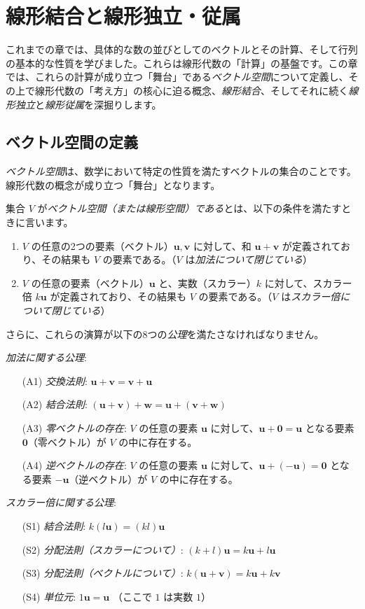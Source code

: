 \section{線形結合と線形独立・従属}
これまでの章では、具体的な数の並びとしてのベクトルとその計算、そして行列の基本的な性質を学びました。これらは線形代数の「計算」の基盤です。この章では、これらの計算が成り立つ「舞台」である\emph{ベクトル空間}について定義し、その上で線形代数の「考え方」の核心に迫る概念、\emph{線形結合}、そしてそれに続く\emph{線形独立}と\emph{線形従属}を深掘りします。
\subsection{ベクトル空間の定義}
\emph{ベクトル空間}は、数学において特定の性質を満たすベクトルの集合のことです。線形代数の概念が成り立つ「舞台」となります。
\begin{dfn}[ベクトル空間]
集合 $V$ が\emph{ベクトル空間（または線形空間）である}とは、以下の条件を満たすときに言います。

\begin{enumerate}
\item $V$ の任意の2つの要素（ベクトル）$\bm{u}, \bm{v}$ に対して、和 $\bm{u} + \bm{v}$ が定義されており、その結果も $V$ の要素である。（$V$ は\emph{加法について閉じている}）
\item $V$ の任意の要素（ベクトル）$\bm{u}$ と、実数（スカラー）$k$ に対して、スカラー倍 $k\bm{u}$ が定義されており、その結果も $V$ の要素である。（$V$ は\emph{スカラー倍について閉じている}）
\end{enumerate}

さらに、これらの演算が以下の8つの\emph{公理}を満たさなければなりません。

\emph{加法に関する公理}:
\begin{itemize}
\item[(A1)] \emph{交換法則}: $\bm{u} + \bm{v} = \bm{v} + \bm{u}$
\item[(A2)] \emph{結合法則}: $(\bm{u} + \bm{v}) + \bm{w} = \bm{u} + (\bm{v} + \bm{w})$
\item[(A3)] \emph{零ベクトルの存在}: $V$ の任意の要素 $\bm{u}$ に対して、$\bm{u} + \bm{0} = \bm{u}$ となる要素 $\bm{0}$（零ベクトル）が $V$ の中に存在する。
\item[(A4)] \emph{逆ベクトルの存在}: $V$ の任意の要素 $\bm{u}$ に対して、$\bm{u} + (-\bm{u}) = \bm{0}$ となる要素 $-\bm{u}$（逆ベクトル）が $V$ の中に存在する。
\end{itemize}

\emph{スカラー倍に関する公理}:
\begin{itemize}
\item[(S1)] \emph{結合法則}: $k(l\bm{u}) = (kl)\bm{u}$
\item[(S2)] \emph{分配法則（スカラーについて）}: $(k+l)\bm{u} = k\bm{u} + l\bm{u}$
\item[(S3)] \emph{分配法則（ベクトルについて）}: $k(\bm{u}+\bm{v}) = k\bm{u} + k\bm{v}$
\item[(S4)] \emph{単位元}: $1\bm{u} = \bm{u}$ （ここで $1$ は実数 $1$）
\end{itemize}
\end{dfn}
